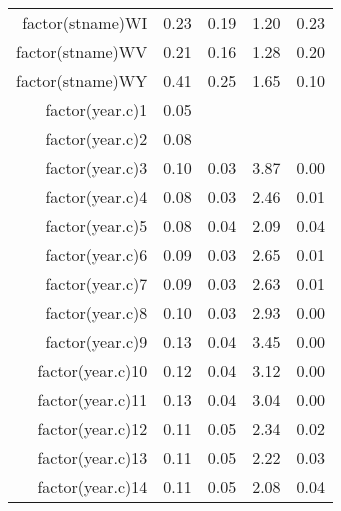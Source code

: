 \begin{table}[ht]
\begin{tabular}{rrrrr}
  factor(stname)WI & 0.23 & 0.19 & 1.20 & 0.23 \\ 
  factor(stname)WV & 0.21 & 0.16 & 1.28 & 0.20 \\ 
  factor(stname)WY & 0.41 & 0.25 & 1.65 & 0.10 \\ 
  factor(year.c)1 & 0.05 &  &  &  \\ 
  factor(year.c)2 & 0.08 &  &  &  \\ 
  factor(year.c)3 & 0.10 & 0.03 & 3.87 & 0.00 \\ 
  factor(year.c)4 & 0.08 & 0.03 & 2.46 & 0.01 \\ 
  factor(year.c)5 & 0.08 & 0.04 & 2.09 & 0.04 \\ 
  factor(year.c)6 & 0.09 & 0.03 & 2.65 & 0.01 \\ 
  factor(year.c)7 & 0.09 & 0.03 & 2.63 & 0.01 \\ 
  factor(year.c)8 & 0.10 & 0.03 & 2.93 & 0.00 \\ 
  factor(year.c)9 & 0.13 & 0.04 & 3.45 & 0.00 \\ 
  factor(year.c)10 & 0.12 & 0.04 & 3.12 & 0.00 \\ 
  factor(year.c)11 & 0.13 & 0.04 & 3.04 & 0.00 \\ 
  factor(year.c)12 & 0.11 & 0.05 & 2.34 & 0.02 \\ 
  factor(year.c)13 & 0.11 & 0.05 & 2.22 & 0.03 \\ 
  factor(year.c)14 & 0.11 & 0.05 & 2.08 & 0.04 \\ 
   \hline
\end{tabular}
\end{table}
